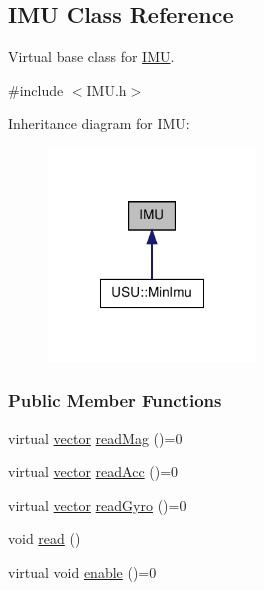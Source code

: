 \hypertarget{class_i_m_u}{\subsection{\-I\-M\-U \-Class \-Reference}
\label{class_i_m_u}
}


\-Virtual base class for \hyperlink{class_i_m_u}{\-I\-M\-U}.  




{\ttfamily \#include $<$\-I\-M\-U.\-h$>$}



\-Inheritance diagram for \-I\-M\-U\-:\nopagebreak
\begin{figure}[H]
\begin{center}
\leavevmode
\includegraphics[width=156pt]{class_i_m_u__inherit__graph}
\end{center}
\end{figure}
\subsubsection*{\-Public \-Member \-Functions}
\begin{DoxyCompactItemize}
\item 
virtual \hyperlink{vector_8h_a148efcf3c5319dd8961dbf9f4b846a98}{vector} \hyperlink{class_i_m_u_a52359006a1ca04d0b1852f374a476f91}{read\-Mag} ()=0
\item 
virtual \hyperlink{vector_8h_a148efcf3c5319dd8961dbf9f4b846a98}{vector} \hyperlink{class_i_m_u_a2928cc8a1fc13464ef90da96fd9358b7}{read\-Acc} ()=0
\item 
virtual \hyperlink{vector_8h_a148efcf3c5319dd8961dbf9f4b846a98}{vector} \hyperlink{class_i_m_u_a887a00b7e1c998a65ee42b021b59d84c}{read\-Gyro} ()=0
\item 
void \hyperlink{class_i_m_u_a1de4cb31f28f71d7cc8b1546ea59b4ab}{read} ()
\item 
virtual void \hyperlink{class_i_m_u_a58899f2357a00a4d1f3b892b879e1e92}{enable} ()=0
\end{DoxyCompactItemize}
